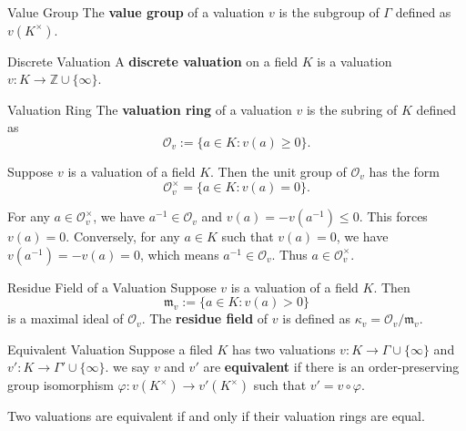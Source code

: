 \begin{definition}{Value Group}{}
    The \textbf{value group} of a valuation $v$ is the subgroup of $\Gamma$ defined as $v(K^{\times})$.
\end{definition}

\begin{definition}{Discrete Valuation}{}
    A \textbf{discrete valuation} on a field $K$ is a valuation $v: K\to \mathbb{Z} \cup\{\infty\}$.
\end{definition}

\begin{definition}{Valuation Ring}{}
    The \textbf{valuation ring} of a valuation $v$ is the subring of $K$ defined as
    $$
    \mathcal{O}_{v}:=\{a \in K: v(a) \geq 0\}.
    $$
\end{definition}

\begin{proposition}{}{}
    Suppose $v$ is a valuation of a field $K$. Then the unit group of $\mathcal{O}_{v}$ has the form 
    $$
    \mathcal{O}_{v}^{\times}=\{a \in K: v(a)=0\}.
    $$  
\end{proposition}

\begin{prf}
    For any $a\in \mathcal{O}_{v}^{\times}$, we have $a^{-1}\in \mathcal{O}_{v}$ and $v(a)=-v(a^{-1})\le 0$. This forces $v(a)=0$. Conversely, for any $a\in K$ such that $v(a)=0$, we have $v(a^{-1})=-v(a)=0$, which means $a^{-1}\in \mathcal{O}_{v}$. Thus $a\in \mathcal{O}_{v}^{\times}$.
\end{prf}

\begin{definition}{Residue Field of a Valuation}{}
    Suppose $v$ is a valuation of a field $K$. Then
    $$
    \mathfrak{m}_v := \{a \in K: v(a)>0\}
    $$
    is a maximal ideal of $\mathcal{O}_{v}$. The \textbf{residue field} of $v$ is defined as $\kappa_v=\mathcal{O}_{v}/\mathfrak{m}_v$.
\end{definition}

\begin{definition}{Equivalent Valuation}{}
    Suppose a filed $K$ has two valuations $v:K\to\Gamma \cup\{\infty\}$ and $v':K\to\Gamma' \cup\{\infty\}$. we say $v$ and $v'$ are \textbf{equivalent} if there is an order-preserving group isomorphism $\varphi: v(K^\times) \rightarrow v'(K^\times)$ such that $v'=v\circ \varphi$.
\end{definition}

\begin{proposition}{}{}
   Two valuations are equivalent if and only if their valuation rings are equal.
\end{proposition}

